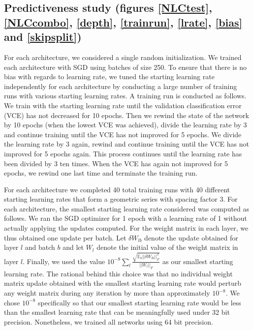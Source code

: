\documentclass{article} %
\begin{document}
\subsection{Predictiveness study (figures \ref{NLCtest}, \ref{NLCcombo}, \ref{depth}, \ref{trainrun}, \ref{lrate}, \ref{bias} and \ref{skipsplit})} \label{nlcTestDetails}

For each architecture, we considered a single random initialization. We trained each architecture with SGD using batches of size 250. To ensure that there is no bias with regards to learning rate, we tuned the starting learning rate independently for each architecture by conducting a large number of training runs with various starting learning rates. A training run is conducted as follows. We train with the starting learning rate until the validation classification error (VCE) has not decreased for 10 epochs. Then we rewind the state of the network by 10 epochs (when the lowest VCE was achieved), divide the learning rate by 3 and continue training until the VCE has not improved for 5 epochs. We divide the learning rate by 3 again, rewind and continue training until the VCE has not improved for 5 epochs again. This process continues until the learning rate has been divided by 3 ten times. When the VCE has again not improved for 5 epochs, we rewind one last time and terminate the training run.

For each architecture we completed 40 total training runs with 40 different starting learning rates that form a geometric series with spacing factor 3. For each architecture, the smallest starting learning rate considered was computed as follows. We ran the SGD optimizer for 1 epoch with a learning rate of 1 without actually applying the updates computed. For the weight matrix in each layer, we thus obtained one update per batch. Let $\delta W_{lb}$ denote the update obtained for layer $l$ and batch $b$ and let $W_l$ denote the initial value of the weight matrix in layer $l$. Finally, we used the value $10^{-8}\sum_l\frac{\sqrt{\mathbb{E}_{b}||\delta W_{lb}||^2_F}}{||W_l||_F}$ as our smallest starting learning rate. The rational behind this choice was that no individual weight matrix update obtained with the smallest starting learning rate would perturb any weight matrix during any iteration by more than approximately $10^{-8}$. We chose $10^{-8}$ specifically so that our smallest starting learning rate would be less than the smallest learning rate that can be meaningfully used under 32 bit precision. Nonetheless, we trained all networks using 64 bit precision. 
\end{document}
